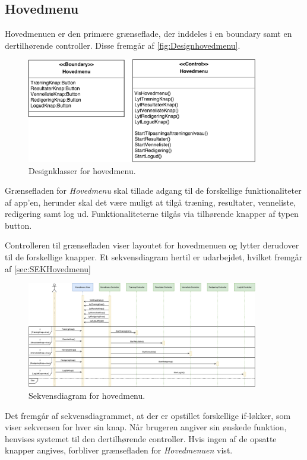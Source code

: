 \subsection*{Hovedmenu} \label{sec:MVCHovedmenu}
Hovedmenuen er den primære grænseflade, der inddeles i en boundary samt en dertilhørende controller. Disse fremgår af \autoref{fig:Designhovedmenu}.

\begin{figure} [H]
\centering
\includegraphics[width=0.9\textwidth]{figures/MVC/MVCHovedmenu}
\caption{Designklasser for hovedmenu.}
\label{fig:Designhovedmenu}
\end{figure}

\noindent
Grænsefladen for \textit{Hovedmenu} skal tillade adgang til de forskellige funktionaliteter af app’en, herunder skal det være muligt at tilgå træning, resultater, venneliste, redigering samt log ud. Funktionaliteterne tilgås via tilhørende knapper af typen button. 

Controlleren til grænsefladen viser layoutet for hovedmenuen og lytter derudover til de forskellige knapper. Et sekvensdiagram hertil er udarbejdet, hvilket fremgår af \autoref{sec:SEKHovedmenu}

\begin{figure} [H]
\centering
\includegraphics[width=0.9\textwidth]{figures/Sek/SEKHovedmenu}
\caption{Sekvensdiagram for hovedmenu.}
\label{fig:SEKHovedmenu}
\end{figure}

Det fremgår af sekvensdiagrammet, at der er opstillet forskellige if-løkker, som viser sekvensen for hver sin knap. Når brugeren angiver sin ønskede funktion, henvises systemet til den dertilhørende controller. Hvis ingen af de opsatte knapper angives, forbliver grænsefladen for \textit{Hovedmenuen} vist. 